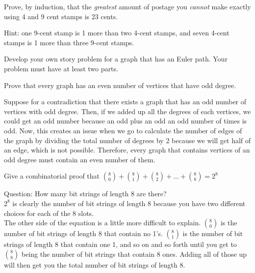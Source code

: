 \documentclass[10pt]{exam}
\begin{document}
\begin{questions}
\begin{solution}
  \end{solution}

\question[4] Prove, by induction, that the {\em greatest} amount of postage you {\em cannot} make exactly using 4 and 9 cent stamps is 23 cents.

  \begin{solution}
 Hint: one 9-cent stamp is 1 more than two 4-cent stamps, and seven 4-cent stamps is 1 more than three 9-cent stamps.
  \end{solution}


\question[6] Develop your own story problem for a graph that has an Euler path. Your problem must have at least two parts.
%	

\question[4] Prove that every graph has an even number of vertices that have odd degree.
\begin{solution}
	Suppose for a contradiction that there exists a graph that has an odd number of vertices with odd degree. Then, if we added up all the degrees of each vertices, we could get an odd number because an odd plus an odd an odd number of times is odd. Now, this creates an issue when we go to calculate the number of edges of the graph by dividing the total number of degrees by 2 because we will get half of an edge, which is not possible. Therefore, every graph that contains vertices of an odd degree must contain an even number of them.
\end{solution}

\question[4] Give a combinatorial proof that ${ 8 \choose 0} + { 8 \choose 1} + { 8 \choose 2} + ... + { 8 \choose 8} = 2^8$
\begin{solution}
	Question: How many bit strings of length 8 are there?\\
	$2^8$ is clearly the number of bit strings of length 8 because you have two different choices for each of the 8 slots.\\
	The other side of the equation is a little more difficult to explain. ${8 \choose 0}$ is the number of bit strings of length 8 that contain no 1's. ${8 \choose 1}$ is the number of bit strings of length 8 that contain one 1, and so on and so forth until you get to ${ 8 \choose 8}$ being the number of bit strings that contain 8 ones. Adding all of those up will then get you the total number of bit strings of length 8.
\end{solution}


\end{questions}
\end{document}
